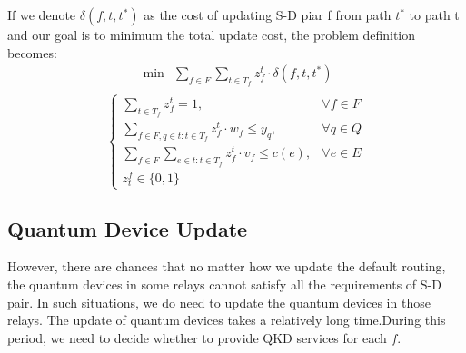 If we denote $\delta(f,t,t^*)$ as the cost of updating S-D piar f from  path $t^*$ to path t and our goal is to minimum the total update cost, the problem definition becomes:
	\begin{equation*}
    \begin{aligned}
    \min \ \ \sum_{f \in F}\sum_{t \in T_f}{z_f^t \cdot \delta(f,t,t^*)} \\
    \end{aligned}
	\end{equation*}
	\begin{equation}\label{eq:throughput}
	\begin{cases}
     \sum_{t \in T_f}{z_f^t} = 1, & \forall f \in F \\
     \sum_{f \in F,q \in t:t \in T_f}{z_f^t \cdot w_f} \le  y_q, & \forall q \in Q \\
     \sum_{f \in F}\sum_{e \in t:t \in T_f}{z_f^t \cdot v_f} \le c(e), & \forall e \in E \\
     z^f_t \in \{0,1\}

	\end{cases}
	\end{equation}

\subsection{Quantum Device Update}
However, there are chances that no matter how we update the default routing, the quantum devices in some relays cannot satisfy all the requirements of S-D pair. In such situations, we do need to update the quantum devices in those relays. The update of quantum devices takes a relatively long time.During this period, we need to decide whether to provide QKD services for each $f$.
